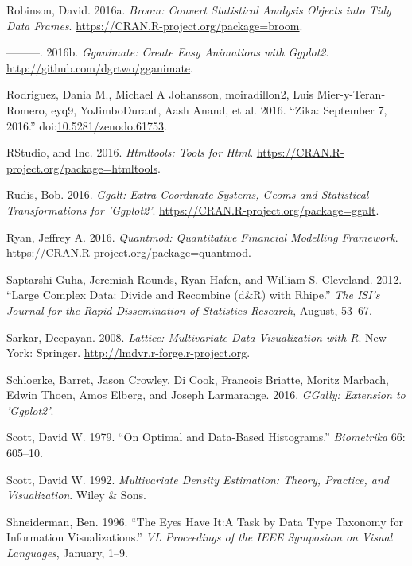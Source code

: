 \documentclass[12pt,]{isuthesis}
\begin{document}
\hypertarget{ref-broom}{}
Robinson, David. 2016a. \emph{Broom: Convert Statistical Analysis
Objects into Tidy Data Frames}.
\url{https://CRAN.R-project.org/package=broom}.

\hypertarget{ref-gganimate}{}
---------. 2016b. \emph{Gganimate: Create Easy Animations with Ggplot2}.
\url{http://github.com/dgrtwo/gganimate}.

\hypertarget{ref-zika-data}{}
Rodriguez, Dania M., Michael A Johansson, moiradillon2, Luis
Mier-y-Teran-Romero, eyq9, YoJimboDurant, Aash Anand, et al. 2016.
``Zika: September 7, 2016.''
doi:\href{https://doi.org/10.5281/zenodo.61753}{10.5281/zenodo.61753}.

\hypertarget{ref-htmltools}{}
RStudio, and Inc. 2016. \emph{Htmltools: Tools for Html}.
\url{https://CRAN.R-project.org/package=htmltools}.

\hypertarget{ref-ggalt}{}
Rudis, Bob. 2016. \emph{Ggalt: Extra Coordinate Systems, Geoms and
Statistical Transformations for 'Ggplot2'}.
\url{https://CRAN.R-project.org/package=ggalt}.

\hypertarget{ref-quantmod}{}
Ryan, Jeffrey A. 2016. \emph{Quantmod: Quantitative Financial Modelling
Framework}. \url{https://CRAN.R-project.org/package=quantmod}.

\hypertarget{ref-RHIPE}{}
Saptarshi Guha, Jeremiah Rounds, Ryan Hafen, and William S. Cleveland.
2012. ``Large Complex Data: Divide and Recombine (d\&R) with Rhipe.''
\emph{The ISI's Journal for the Rapid Dissemination of Statistics
Research}, August, 53--67.

\hypertarget{ref-lattice}{}
Sarkar, Deepayan. 2008. \emph{Lattice: Multivariate Data Visualization
with R}. New York: Springer. \url{http://lmdvr.r-forge.r-project.org}.

\hypertarget{ref-GGally}{}
Schloerke, Barret, Jason Crowley, Di Cook, Francois Briatte, Moritz
Marbach, Edwin Thoen, Amos Elberg, and Joseph Larmarange. 2016.
\emph{GGally: Extension to 'Ggplot2'}.

\hypertarget{ref-hist-scott}{}
Scott, David W. 1979. ``On Optimal and Data-Based Histograms.''
\emph{Biometrika} 66: 605--10.

\hypertarget{ref-mde}{}
Scott, David W. 1992. \emph{Multivariate Density Estimation: Theory,
Practice, and Visualization}. Wiley \& Sons.

\hypertarget{ref-details-on-demand}{}
Shneiderman, Ben. 1996. ``The Eyes Have It:A Task by Data Type Taxonomy
for Information Visualizations.'' \emph{VL Proceedings of the IEEE
Symposium on Visual Languages}, January, 1--9.
\end{document}
